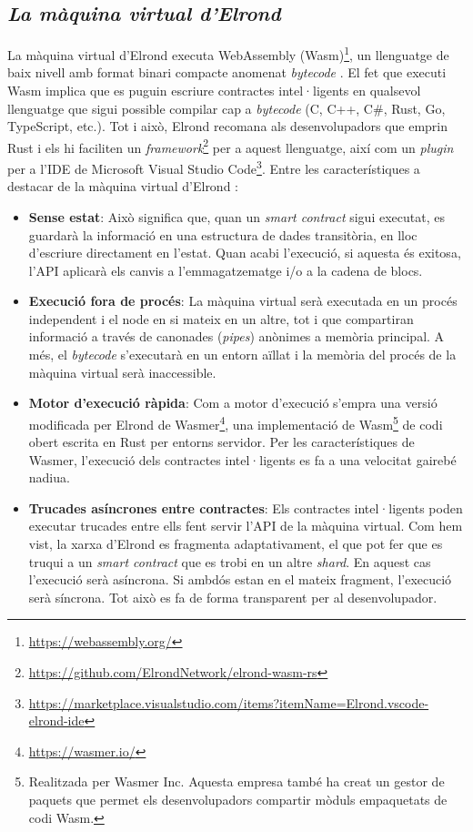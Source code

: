 \documentclass[11pt,a4paper]{article}
\begin{document}
\subsection{\textit{La màquina virtual d'Elrond}}
La màquina virtual d'Elrond executa WebAssembly (Wasm)\footnote{\url{https://webassembly.org/}}, un llenguatge de baix nivell amb format binari compacte anomenat \textit{bytecode} \cite{mozilla2021}. El fet que executi Wasm implica que es puguin escriure contractes intel·ligents en qualsevol llenguatge que sigui possible compilar cap a \textit{bytecode} (C, C++, C\#, Rust, Go, TypeScript, etc.). Tot i això, Elrond recomana als desenvolupadors que emprin Rust i els hi faciliten un \textit{framework}\footnote{\url{https://github.com/ElrondNetwork/elrond-wasm-rs}} per a aquest llenguatge, així com un \textit{plugin} per a l'IDE de Microsoft Visual Studio Code\footnote{\scriptsize\url{https://marketplace.visualstudio.com/items?itemName=Elrond.vscode-elrond-ide}}. Entre les característiques a destacar de la màquina virtual d'Elrond \cite{elrond2022,mincub2020}:
\begin{itemize}
	\item \textbf{Sense estat}: Això significa que, quan un \textit{smart contract} sigui executat, es guardarà la informació en una estructura de dades transitòria, en lloc d'escriure directament en l'estat. Quan acabi l'execució, si aquesta és exitosa, l'API aplicarà els canvis a l'emmagatzematge i/o a la cadena de blocs. 
	\item \textbf{Execució fora de procés}: La màquina virtual serà executada en un procés independent i el node en si mateix en un altre, tot i que compartiran informació a través de canonades (\textit{pipes}) anònimes a memòria principal.  A més, el \textit{bytecode} s'executarà en un entorn aïllat i la memòria del procés de la màquina virtual serà inaccessible.
	\item \textbf{Motor d'execució ràpida}: Com a motor d'execució s'empra una versió modificada per Elrond de Wasmer\footnote{\url{https://wasmer.io/}}, una implementació de Wasm\footnote{Realitzada per Wasmer Inc. Aquesta empresa també ha creat un gestor de paquets que permet els desenvolupadors compartir mòduls empaquetats de codi Wasm.} de codi obert escrita en Rust per entorns servidor. Per les característiques de Wasmer, l'execució dels contractes intel·ligents es fa a una velocitat gairebé nadiua.
	\item \textbf{Trucades asíncrones entre contractes}: Els contractes intel·ligents poden executar trucades entre ells fent servir l'API de la màquina virtual. Com hem vist, la xarxa d'Elrond es fragmenta adaptativament, el que pot fer que es truqui a un \textit{smart contract} que es trobi en un altre \textit{shard}. En aquest cas l'execució serà asíncrona. Si ambdós estan en el mateix fragment, l'execució serà síncrona. Tot això es fa de forma transparent per al desenvolupador.
\end{itemize}
\end{document}
